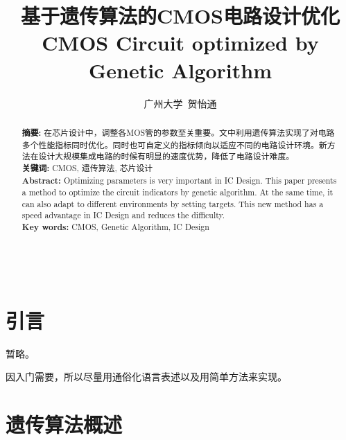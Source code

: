 \documentclass[14pt, a4paper]{article}
\begin{document}
\title{\textbf{基于遗传算法的CMOS电路设计优化\\CMOS Circuit optimized by Genetic Algorithm}}
\author{广州大学\ 贺怡通}
\maketitle

\begin{abstract}
    \noindent
    \textbf{摘要: }在芯片设计中，调整各MOS管的参数至关重要。文中利用遗传算法实现了对电路多个性能指标同时优化。同时也可自定义的指标倾向以适应不同的电路设计环境。新方法在设计大规模集成电路的时候有明显的速度优势，降低了电路设计难度。\\
    \textbf{关键词: }CMOS, 遗传算法, 芯片设计 \\
    
    \noindent
    \textbf{Abstract: }Optimizing parameters is very important in IC Design. This paper presents a method to optimize the circuit indicators by genetic algorithm. At the same time, it can also adapt to different environments by setting targets. This new method has a speed advantage in IC Design and reduces the difficulty. \\
    \textbf{Key words:} CMOS, Genetic Algorithm, IC Design \\ \\ \\ \\ %
    
\end{abstract}

\begin{multicols}{2}
    \tableofcontents
\end{multicols}

\twocolumn

\section{引言}
暂略。

因入门需要，所以尽量用通俗化语言表述以及用简单方法来实现。

\section{遗传算法概述}
\end{document}
